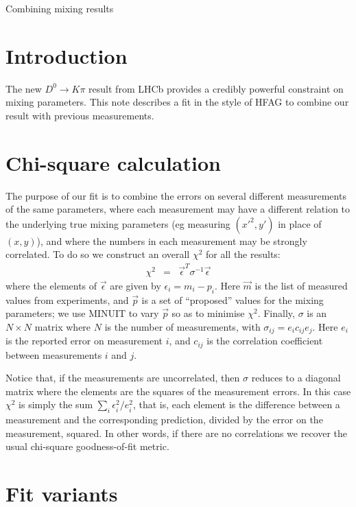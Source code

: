\documentclass[12pt,pdflatex]{article}
\begin{document}
\begin{center}
{\LARGE Combining mixing results}
\end{center}

\section{Introduction}

The new $D^0\to K\pi$ result from LHCb provides a credibly powerful constraint
on mixing parameters. This note describes a fit in the style of HFAG to combine 
our result with previous measurements. 

\section{Chi-square calculation}

The purpose of our fit is to combine the errors on several different
measurements of the same parameters, where each measurement may have a
different relation to the underlying true mixing parameters (eg measuring
$(x'^2, y')$ in place of $(x, y)$), and where the numbers in each measurement
may be strongly correlated. To do so we construct an overall $\chi^2$ for
all the results:
\begin{eqnarray}
\chi^2 &=& \vec\epsilon^T \sigma^{-1} \vec\epsilon
\end{eqnarray}
where the elements of $\vec\epsilon$ are given by
$\epsilon_i = m_i - p_i$. Here $\vec m$ is the list of measured
values from experiments, and $\vec p$ is a set of ``proposed'' values
for the mixing parameters; we use MINUIT to vary $\vec p$ so as
to minimise $\chi^2$. Finally, $\sigma$ is an $N\times N$ matrix where
$N$ is the number of measurements, with $\sigma_{ij} = e_i c_{ij} e_j$.
Here $e_i$ is the reported error on measurement $i$, and $c_{ij}$ is the
correlation coefficient between measurements $i$ and $j$. 

Notice that, if
the measurements are uncorrelated, then $\sigma$ reduces to
a diagonal matrix where the elements are the squares of the measurement
errors. In this case $\chi^2$ is simply the sum $\sum\limits_{i}\epsilon_i^2/e_i^2$,
that is, each element is the difference between a measurement
and the corresponding prediction, divided by the error on the measurement,
squared. In other words, if there are no correlations we recover
the usual chi-square goodness-of-fit metric. 

\section{Fit variants}
\end{document}

